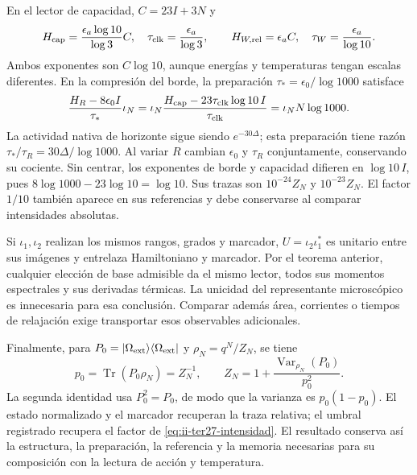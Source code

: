 En el lector de capacidad, $C=23I+3N$ y
\begin{equation}
 H_{\rm cap}=\frac{\epsilon_a\log10}{\log3}C,
 \quad\tau_{\rm clk}=\frac{\epsilon_a}{\log3},\qquad
 H_{W,\rm rel}=\epsilon_a C,
 \quad\tau_W=\frac{\epsilon_a}{\log10}.
 \label{eq:ii-ter27-hcap}
\end{equation}
Ambos exponentes son $C\log10$, aunque energías y temperaturas tengan
escalas diferentes. En la compresión del borde, la preparación
$\tau_*=\epsilon_0/\log1000$ satisface
\[
 \frac{H_R-8\epsilon_0I}{\tau_*}\iota_N
 =\iota_N\frac{H_{\rm cap}-23\tau_{\rm clk}\log10\,I}{\tau_{\rm clk}}
 =\iota_N N\log1000.
\]
La actividad nativa de horizonte sigue siendo $e^{-30\Delta}$; esta
preparación tiene razón $\tau_*/\tau_R=30\Delta/\log1000$. Al variar
$R$ cambian $\epsilon_0$ y $\tau_R$ conjuntamente, conservando su cociente.
Sin centrar, los exponentes de borde y capacidad difieren en
$\log10\,I$, pues $8\log1000-23\log10=\log10$. Sus trazas son
$10^{-24}Z_N$ y $10^{-23}Z_N$. El factor $1/10$ también aparece en
sus referencias y debe conservarse al comparar intensidades absolutas.

Si $\iota_1,\iota_2$ realizan los mismos rangos, grados y marcador,
$U=\iota_2\iota_1^*$ es unitario entre sus imágenes y entrelaza
Hamiltoniano y marcador. Por el teorema anterior, cualquier elección de
base admisible da el mismo lector, todos sus momentos espectrales y sus
derivadas térmicas. La unicidad del representante microscópico es
innecesaria para esa conclusión. Comparar además área, corrientes o
tiempos de relajación exige transportar esos observables adicionales.

Finalmente, para $P_0=|\Omega_{\rm ext}\rangle\langle\Omega_{\rm ext}|$
y $\rho_N=q^N/Z_N$, se tiene
\[
 p_0=\operatorname{Tr}(P_0\rho_N)=Z_N^{-1},\qquad
 Z_N=1+\frac{\operatorname{Var}_{\rho_N}(P_0)}{p_0^2}.
\]
La segunda identidad usa $P_0^2=P_0$, de modo que la varianza es
$p_0(1-p_0)$. El estado normalizado y el marcador recuperan la traza
relativa; el umbral registrado recupera el factor de
\eqref{eq:ii-ter27-intensidad}. El resultado conserva así la estructura,
la preparación, la referencia y la memoria necesarias para su composición
con la lectura de acción y temperatura.
